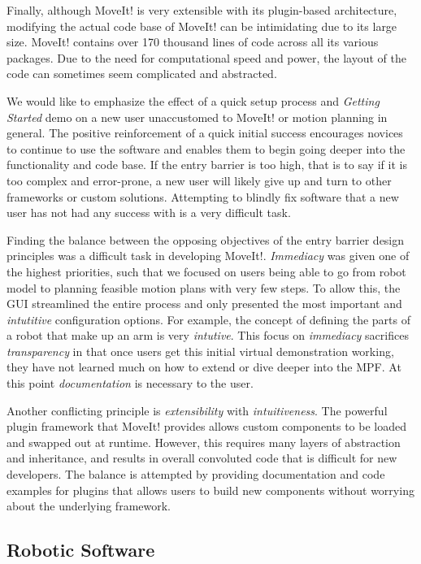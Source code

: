 \documentclass[10pt,journal,compsoc]{joser1}
\begin{document}
{Finally, although MoveIt! is very extensible with its plugin-based architecture,
modifying the actual code base of MoveIt! can be intimidating due to its large
size. MoveIt! contains over 170 thousand lines of code across all its various
packages. Due to the need for computational speed and power, the layout of the
code can sometimes seem complicated and abstracted. 

We would like to emphasize the effect of a quick setup process and
\textit{Getting Started} demo on a new user unaccustomed to MoveIt! or motion
planning in general. The positive reinforcement of a quick initial success
encourages novices to continue to use the software and enables them to begin
going deeper into the functionality and code base. If the entry barrier is too
high, that is to say if it is too complex and error-prone, a new user will
likely give up and turn to other frameworks or custom solutions. Attempting to
blindly fix software that a new user has not had any success with is a very
difficult task.

Finding the balance between the opposing objectives of the entry barrier design principles was a difficult task in developing MoveIt!. \textit{Immediacy} was given one of the highest priorities, such that we focused on users being able to go from robot model to planning feasible motion plans with very few steps. To allow this, the GUI streamlined the entire process and only presented the most important and \textit{intutitive} configuration options. For example, the concept of defining the parts of a robot that make up an arm is very \textit{intutive}. This focus on \textit{immediacy} sacrifices \textit{transparency} in that once users get this initial virtual demonstration working, they have not learned much on how to extend or dive deeper into the MPF. At this point \textit{documentation} is necessary to the user. 

Another conflicting principle is \textit{extensibility} with \textit{intuitiveness}. The powerful plugin framework that MoveIt! provides allows custom components to be loaded and swapped out at runtime. However, this requires many layers of abstraction and inheritance, and results in overall convoluted code that is difficult for new developers. The balance is attempted by providing documentation and code examples for plugins that allows users to build new components without worrying about the underlying framework.

\subsection{Robotic Software}
\label{sec::robotic_discussion}

}
\end{document}

